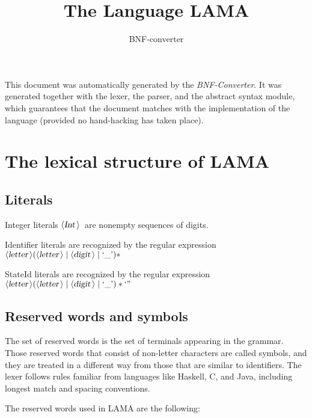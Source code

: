 \documentclass[a4paper,11pt]{article}
\author{BNF-converter}
\title{The Language LAMA}
\begin{document}
\maketitle

\newcommand{\emptyP}{\mbox{$\epsilon$}}
\newcommand{\terminal}[1]{\mbox{{\texttt {#1}}}}
\newcommand{\nonterminal}[1]{\mbox{$\langle \mbox{{\sl #1 }} \! \rangle$}}
\newcommand{\arrow}{\mbox{::=}}
\newcommand{\delimit}{\mbox{$|$}}
\newcommand{\reserved}[1]{\mbox{{\texttt {#1}}}}
\newcommand{\literal}[1]{\mbox{{\texttt {#1}}}}
\newcommand{\symb}[1]{\mbox{{\texttt {#1}}}}

This document was automatically generated by the {\em BNF-Converter}. It was generated together with the lexer, the parser, and the abstract syntax module, which guarantees that the document matches with the implementation of the language (provided no hand-hacking has taken place).

\section*{The lexical structure of LAMA}

\subsection*{Literals}
Integer literals \nonterminal{Int}\ are nonempty sequences of digits.





Identifier literals are recognized by the regular expression
\({\nonterminal{letter}} ({\nonterminal{letter}} \mid {\nonterminal{digit}} \mid \mbox{`\_'})*\)

StateId literals are recognized by the regular expression
\({\nonterminal{letter}} ({\nonterminal{letter}} \mid {\nonterminal{digit}} \mid \mbox{`\_'})* \mbox{`''}\)


\subsection*{Reserved words and symbols}
The set of reserved words is the set of terminals appearing in the grammar. Those reserved words that consist of non-letter characters are called symbols, and they are treated in a different way from those that are similar to identifiers. The lexer follows rules familiar from languages like Haskell, C, and Java, including longest match and spacing conventions.

The reserved words used in LAMA are the following: \\
\end{document}
